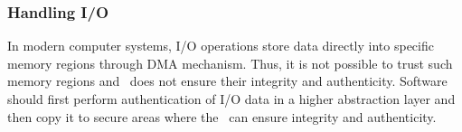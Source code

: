 	  \subsubsection{Handling I\slash{}O}
	  \label{subsubsec:io}
  In modern computer systems, I\slash{}O operations store data directly into specific memory regions through DMA mechanism. Thus, it is not possible to trust such memory regions and \system~does not ensure their integrity and authenticity. Software should first perform authentication of I\slash{}O data in a higher abstraction layer and then copy it to secure areas where the \system~can ensure integrity and authenticity.
% 
% 
% 
% 
%   
% 
